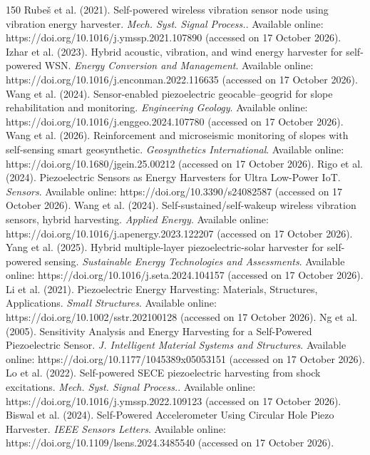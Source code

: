 \begin{thebibliography}{150}
Rubeš et al. (2021). Self-powered wireless vibration sensor node using vibration energy harvester. \textit{Mech. Syst. Signal Process.}. Available online: https://doi.org/10.1016/j.ymssp.2021.107890 (accessed on 17 October 2026).
Izhar et al. (2023). Hybrid acoustic, vibration, and wind energy harvester for self-powered WSN. \textit{Energy Conversion and Management}. Available online: https://doi.org/10.1016/j.enconman.2022.116635 (accessed on 17 October 2026).
Wang et al. (2024). Sensor-enabled piezoelectric geocable–geogrid for slope rehabilitation and monitoring. \textit{Engineering Geology}. Available online: https://doi.org/10.1016/j.enggeo.2024.107780 (accessed on 17 October 2026).
Wang et al. (2026). Reinforcement and microseismic monitoring of slopes with self-sensing smart geosynthetic. \textit{Geosynthetics International}. Available online: https://doi.org/10.1680/jgein.25.00212 (accessed on 17 October 2026).
Rigo et al. (2024). Piezoelectric Sensors as Energy Harvesters for Ultra Low-Power IoT. \textit{Sensors}. Available online: https://doi.org/10.3390/s24082587 (accessed on 17 October 2026).
Wang et al. (2024). Self-sustained/self-wakeup wireless vibration sensors, hybrid harvesting. \textit{Applied Energy}. Available online: https://doi.org/10.1016/j.apenergy.2023.122207 (accessed on 17 October 2026).
Yang et al. (2025). Hybrid multiple-layer piezoelectric-solar harvester for self-powered sensing. \textit{Sustainable Energy Technologies and Assessments}. Available online: https://doi.org/10.1016/j.seta.2024.104157 (accessed on 17 October 2026).
Li et al. (2021). Piezoelectric Energy Harvesting: Materials, Structures, Applications. \textit{Small Structures}. Available online: https://doi.org/10.1002/sstr.202100128 (accessed on 17 October 2026).
Ng et al. (2005). Sensitivity Analysis and Energy Harvesting for a Self-Powered Piezoelectric Sensor. \textit{J. Intelligent Material Systems and Structures}. Available online: https://doi.org/10.1177/1045389x05053151 (accessed on 17 October 2026).
Lo et al. (2022). Self-powered SECE piezoelectric harvesting from shock excitations. \textit{Mech. Syst. Signal Process.}. Available online: https://doi.org/10.1016/j.ymssp.2022.109123 (accessed on 17 October 2026).
Biswal et al. (2024). Self-Powered Accelerometer Using Circular Hole Piezo Harvester. \textit{IEEE Sensors Letters}. Available online: https://doi.org/10.1109/lsens.2024.3485540 (accessed on 17 October 2026).

\end{thebibliography}

